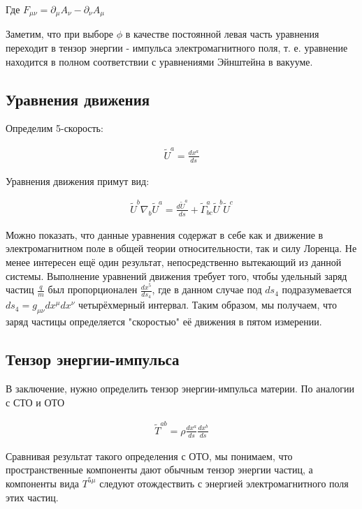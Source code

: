 \documentclass[a4paper,14pt]{article}
\begin{document}
	Где $ F_{\mu \nu} = \partial_{\mu} A_{\nu} - \partial_{\nu} A_{\mu} $

	Заметим, что при выборе $\phi$ в качестве постоянной левая часть уравнения переходит в тензор энергии - импульса электромагнитного поля, т. е. уравнение находится в полном соответствии с уравнениями Эйнштейна в вакууме.

\subsection*{Уравнения движения}

	Определим 5-скорость:

	\begin{align*}
	 	\tilde{U}^a = \frac{dx^a}{ds}
	\end{align*}

	Уравнения движения примут вид:

	\begin{align*}
	 \tilde{U}^b \nabla_b \tilde{U}^a = \frac{d \tilde{U}^a}{ds} + \tilde{\Gamma}_{bc}^a \tilde{U}^b \tilde{U}^c
	\end{align*}

	Можно показать, что данные уравнения содержат в себе как и движение в электромагнитном поле в общей теории относительности, так и силу Лоренца. Не менее интересен ещё один результат, непосредственно вытекающий из данной системы. Выполнение уравнений движения требует того, чтобы удельный заряд частиц $ \frac{q}{m} $ был пропорционален $ \frac{dx^5}{ds_4} $, где в данном случае под $ ds_4 $ подразумевается $ ds_4 = g_{\mu \nu} dx^{\mu} dx^{\nu} $ четырёхмерный интервал. Таким образом, мы получаем, что заряд частицы определяется "скоростью" её движения в пятом измерении.


\subsection*{Тензор энергии-импульса}

	В заключение, нужно определить тензор энергии-импульса материи. По аналогии с СТО и ОТО 

	\begin{align*}
	 	\tilde{T}^{ab} = \rho \frac{dx^a}{ds} \frac{dx^b}{ds}
	\end{align*}

	Сравнивая результат такого определения с ОТО, мы понимаем, что пространственные компоненты дают обычным тензор энергии частиц, а компоненты вида $ T^{5 \mu} $ следуют отождествить с энергией электромагнитного поля этих частиц.
\end{document}
